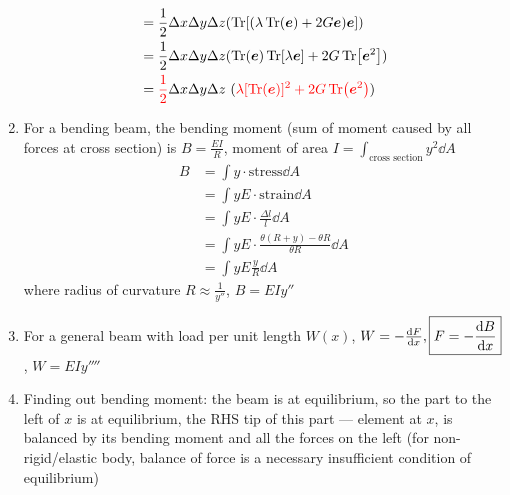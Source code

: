 \documentclass{article}
\theoremstyle{remark}
\theoremstyle{remark}
\begin{document}
\begin{enumerate}
\begin{align*}
        &= \frac{1}{2}\Delta x\Delta y\Delta z(\Tr[(\lambda \Tr(\bm{e})+2G\bm{e})\bm{e}])\\
        &= \frac{1}{2}\Delta x\Delta y\Delta z(\Tr(\bm{e})\Tr[\lambda\bm{e}]+2G\Tr[\bm{e}^2])\\
        &= \textcolor{red}{\frac{1}{2}}\Delta x\Delta y\Delta z\ (\textcolor{red}{\lambda[\Tr(\bm{e})]^2+2G\Tr(\bm{e}^2)})
    \end{align*}
    \item For a bending beam, the bending moment (sum of moment caused by all forces at cross section) is $\boxed{B=\frac{EI}{R}}$, moment of area $\boxed{I=\int_{\text{cross section}} y^2\dd A}$\begin{align*}
        B&=\int y\cdot\text{stress}\dd A \\
         &=\int yE\cdot\text{strain}\dd A \\
         &=\int yE\cdot\frac{\Delta l}{l}\dd A\\
         &=\int yE\cdot\frac{\theta(R+y)-\theta R}{\theta R}\dd A\\
         &=\int yE\frac{y}{R}\dd A
    \end{align*}
    where radius of curvature $R\approx \frac{1}{y''}$, $\boxed{B=EIy''}$
    \item For a general beam with load per unit length $W(x)$, $W=-\dv{F}{x},\boxed{F=-\dv{B}{x}}$, $\boxed{W=EIy''''}$
    \item Finding out bending moment: the beam is at equilibrium, so the part to the left of $x$ is at equilibrium, the RHS tip of this part --- element at $x$, is balanced by its bending moment and all the forces on the left (for non-rigid/elastic body, balance of force is a necessary insufficient condition of equilibrium)
    

\end{enumerate}
\end{document}
